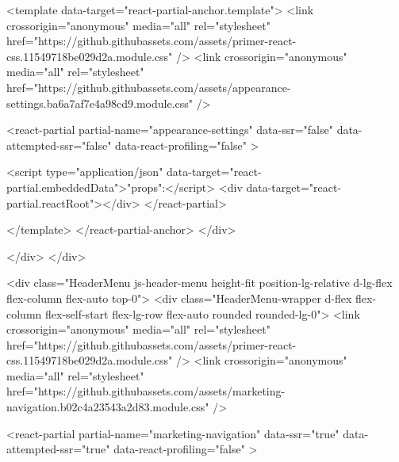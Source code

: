       <template data-target="react-partial-anchor.template">
        <link crossorigin="anonymous" media="all" rel="stylesheet" href="https://github.githubassets.com/assets/primer-react-css.11549718be029d2a.module.css" />
<link crossorigin="anonymous" media="all" rel="stylesheet" href="https://github.githubassets.com/assets/appearance-settings.ba6a7af7e4a98cd9.module.css" />

<react-partial
  partial-name="appearance-settings"
  data-ssr="false"
  data-attempted-ssr="false"
  data-react-profiling="false"
>
  
  <script type="application/json" data-target="react-partial.embeddedData">{"props":{}}</script>
  <div data-target="react-partial.reactRoot"></div>
</react-partial>


      </template>
    </react-partial-anchor>
  </div>

      </div>
    </div>


    <div class="HeaderMenu js-header-menu height-fit position-lg-relative d-lg-flex flex-column flex-auto top-0">
      <div class="HeaderMenu-wrapper d-flex flex-column flex-self-start flex-lg-row flex-auto rounded rounded-lg-0">
          <link crossorigin="anonymous" media="all" rel="stylesheet" href="https://github.githubassets.com/assets/primer-react-css.11549718be029d2a.module.css" />
<link crossorigin="anonymous" media="all" rel="stylesheet" href="https://github.githubassets.com/assets/marketing-navigation.b02c4a23543a2d83.module.css" />

<react-partial
  partial-name="marketing-navigation"
  data-ssr="true"
  data-attempted-ssr="true"
  data-react-profiling="false"
>
  
